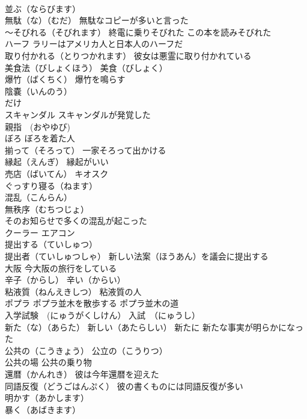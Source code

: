 \documentclass[8pt]{extreport}
\begin{document}
\begin{CJK}{UTF8}{min}
\\	並ぶ（ならびます）
\\	無駄（な）（むだ） 無駄なコピーが多いと言った
\\	～そびれる（そびれます） 終電に乗りそびれた この本を読みそびれた
\\	ハーフ ラリーはアメリカ人と日本人のハーフだ
\\	取り付かれる（とりつかれます） 彼女は悪霊に取り付かれている
\\	美食法（びしょくほう） 美食（びしょく）
\\	爆竹（ばくちく） 爆竹を鳴らす
\\	陰嚢（いんのう）
\\	だけ
\\	スキャンダル スキャンダルが発覚した
\\	親指　(おやゆび)
\\	ぼろ ぼろを着た人
\\	揃って（そろって） 一家そろって出かける
\\	縁起（えんぎ） 縁起がいい
\\	売店（ばいてん） キオスク
\\	ぐっすり寝る（ねます）
\\	混乱（こんらん）
\\	無秩序（むちつじょ）
\\	そのお知らせで多くの混乱が起こった
\\	クーラー エアコン
\\	提出する（ていしゅつ） 
\\	提出者（ていしゅつしゃ） 新しい法案（ほうあん）を議会に提出する
\\	大阪 今大阪の旅行をしている
\\	辛子（からし） 辛い（からい）
\\	粘液質（ねんえきしつ） 粘液質の人
\\	ポプラ ポプラ並木を散歩する ポプラ並木の道
\\	入学試験　(にゅうがくしけん） 入試　（にゅうし）
\\	新た（な）（あらた） 新しい（あたらしい） 新たに 新たな事実が明らかになった
\\	公共の（こうきょう） 公立の（こうりつ） 
\\	公共の場 公共の乗り物
\\	還暦（かんれき） 彼は今年還暦を迎えた
\\	同語反復（どうごはんぷく） 彼の書くものには同語反復が多い
\\	明かす（あかします） 
\\	暴く（あばきます） 

\end{CJK}
\end{document}
